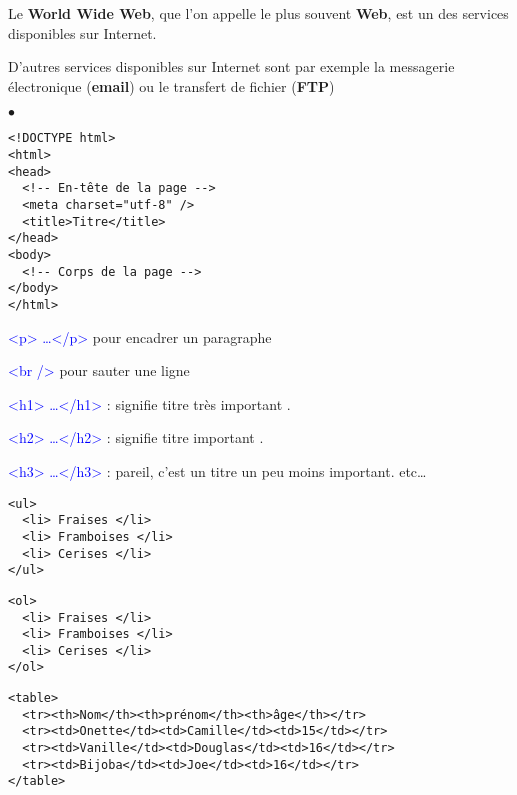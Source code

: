 \documentclass[10pt,dvipsnames, dvips, svgnames]{article}
\begin{document}
Le \textbf{World Wide Web}, que l'on appelle le plus souvent \textbf{Web}, est un des services disponibles sur Internet.

D'autres services disponibles sur Internet sont par exemple la messagerie électronique (\textbf{email}) ou le transfert de fichier (\textbf{FTP})

\begin{list}{$\bullet$}{}
\item 
{}
\begin{lstlisting}
<!DOCTYPE html>
<html>
<head>
  <!-- En-tête de la page -->
  <meta charset="utf-8" />
  <title>Titre</title>
</head>
<body>
  <!-- Corps de la page -->
</body>
</html>
\end{lstlisting}
\item \textcolor{Blue}{<p> \dots </p>} pour encadrer un paragraphe
\item \textcolor{Blue}{<br />} pour sauter une ligne
\item  \textcolor{Blue}{<h1> \dots </h1>} : signifie \og titre très important \fg.
\item  \textcolor{Blue}{<h2> \dots </h2>} : signifie \og titre important \fg.
\item  \textcolor{Blue}{<h3> \dots </h3>} : pareil, c'est un titre un peu moins important.  etc\dots
\item \begin{minipage}[t]{0.5\linewidth}
\begin{lstlisting}
<ul>
  <li> Fraises </li>
  <li> Framboises </li>
  <li> Cerises </li>
</ul>
\end{lstlisting}
\end{minipage}
\begin{minipage}[t]{0.5\linewidth}
\begin{lstlisting}
<ol>
  <li> Fraises </li>
  <li> Framboises </li>
  <li> Cerises </li>
</ol>
\end{lstlisting}
\end{minipage}
\item {}
\begin{lstlisting}
<table>
  <tr><th>Nom</th><th>prénom</th><th>âge</th></tr>
  <tr><td>Onette</td><td>Camille</td><td>15</td></tr>
  <tr><td>Vanille</td><td>Douglas</td><td>16</td></tr>
  <tr><td>Bijoba</td><td>Joe</td><td>16</td></tr>
</table>
\end{lstlisting}


\end{list}
\end{document}
